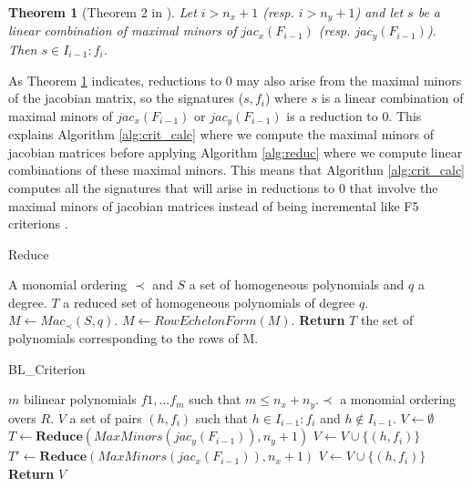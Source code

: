 \documentclass[english]{article}
\newtheorem{theorem}{Theorem}[section]
\begin{document}
		\begin{theorem}[Theorem 2 in \cite{FSS11}]\label{theoremMaxMin}
			Let $i > n_x + 1$ (resp. $i > n_y + 1$) and let $s$ be a linear combination of maximal minors of $jac_{x}(F_{i-1})$ (resp. $jac_{y}(F_{i-1})$). Then $s \in I_{i-1} : f_i$.
		\end{theorem}
		
		As Theorem \ref{theoremMaxMin} indicates, reductions to 0 may also arise from the maximal minors of the jacobian matrix, so the signatures ($s, f_i$) where $s$ is a linear combination of maximal minors of $jac_{x}(F_{i-1})$ or $jac_{y}(F_{i-1})$ is a reduction to 0.
		This explains Algorithm \ref{alg:crit_calc} where we compute the maximal minors of jacobian matrices before applying Algorithm \ref{alg:reduc} where we compute linear combinations of these maximal minors.
		This means that Algorithm \ref{alg:crit_calc} computes all the signatures that will arise in reductions to 0 that involve the maximal minors of jacobian matrices instead of being incremental like F5 criterions \cite{F02}.
		
		\begin{algorithm}
			\caption{Reduce}\label{alg:reduc}
			\begin{algorithmic}[1]
				\Require A monomial ordering $\prec$ and $S$ a set of homogeneous polynomials and $q$ a degree.
				\Ensure $T$ a reduced set of homogeneous polynomials of degree $q$.
				\State $M \gets Mac_{\prec}(S, q)$.
				\State $M \gets RowEchelonForm(M)$.
				\State \textbf{Return} $T$ the set of polynomials corresponding to the rows of M.
			\end{algorithmic}
		\end{algorithm}
		
		\begin{algorithm}
			\caption{BL\_Criterion}\label{alg:crit_calc}
			\begin{algorithmic}[1]
				\Require $m$ bilinear polynomials $f1,...f_m$ such that $m \leq n_x + n_y$.\newline $\prec$ a monomial ordering overs $R$.
				\Ensure $V$ a set of pairs $(h, f_i)$ such that $h \in I_{i-1} : f_i$ and $h \notin I_{i-1}$.
				\State $V \gets \emptyset$
				\For{$i$ from 2 to $m$}
				\If{$i > n_y$}
				\State $T \gets \mathbf{Reduce}(MaxMinors(jac_y(F_{i-1})), n_y + 1)$
				\For{$h$ in $T$}
				\State $V \gets V \cup \{(h, f_i)\}$
				\EndFor
				\EndIf
				\If{$i > n_x$}
				\State $T' \gets \mathbf{Reduce}(MaxMinors(jac_x(F_{i-1})), n_x + 1)$
				\For{$h$ in $T'$}
				\State $V \gets V \cup \{(h, f_i)\}$
				\EndFor
				\EndIf
				\EndFor
				\State \textbf{Return} $V$
			\end{algorithmic}
		\end{algorithm}
		
\end{document}
